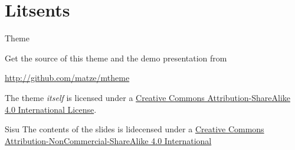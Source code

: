 \section{Litsents}
\begin{frame}{Theme}

  Get the source of this theme and the demo presentation from

  \begin{center}\url{http://github.com/matze/mtheme}\end{center}

  The theme \emph{itself} is licensed under a
  \href{http://creativecommons.org/licenses/by-sa/4.0/}{Creative Commons
  Attribution-ShareAlike 4.0 International License}.

  \begin{center}\ccbysa\end{center}

\end{frame}

\begin{frame}{Sisu}
	The contents of the slides is lidecensed under a \href{http://creativecommons.org/licenses/by-nc-sa/4.0/}{Creative Commons Attribution-NonCommercial-ShareAlike 4.0 International}
	\begin{center}\ccbyncsa\end{center}
\end{frame}


